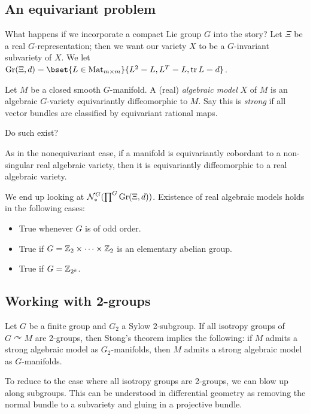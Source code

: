 \documentclass{amsart}
\begin{document}
\subsection{An equivariant problem}

What happens if we incorporate a compact Lie group $G$ into the story?
Let $\Xi$ be a real $G$-representation; then we want our variety $X$ to be a $G$-invariant subvariety of $X$.
We let $\Gr(\Xi, d) = \bset{L \in \Mat_{m \times m}}{L^2 = L, L^T = L, \tr L = d}$.

Let $M$ be a closed smooth $G$-manifold.
A (real) \emph{algebraic model} $X$ of $M$ is an algebraic $G$-variety equivariantly diffeomorphic to $M$.
Say this is \emph{strong} if all vector bundles are classified by equivariant rational maps.

\begin{qn}
  Do such exist?
\end{qn}

\begin{thm}
  As in the nonequivariant case, if a manifold is equivariantly cobordant to a non-singular real algebraic variety, then it is equivariantly diffeomorphic to a real algebraic variety.
\end{thm}

We end up looking at $\mathcal{N}_*^G(\prod^G \operatorname{Gr}(\Xi, d))$.
Existence of real algebraic models holds in the following cases:
\begin{itemize}
  \item True whenever $G$ is of odd order.
  \item True if $G = \mathbb{Z}_2 \times \dots \times \mathbb{Z}_2$ is an elementary abelian group.
  \item True if $G = \mathbb{Z}_{2^k}$.
\end{itemize}

\subsection{Working with 2-groups}

Let $G$ be a finite group and $G_2$ a Sylow 2-subgroup.
If all isotropy groups of $G \curvearrowright M$ are 2-groups, then Stong's theorem implies the following:
if $M$ admits a strong algebraic model as $G_2$-manifolds, then $M$ admits a strong algebraic model as $G$-manifolds.

To reduce to the case where all isotropy groups are 2-groups, we can blow up along subgroups.
This can be understood in differential geometry as removing the normal bundle to a subvariety and gluing in a projective bundle.
\end{document}
